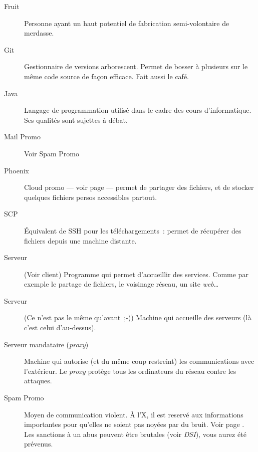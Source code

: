 \begin{description}
  \item[Fruit] Personne ayant un haut potentiel de fabrication semi-volontaire de merdasse.%

  \item[Git] Gestionnaire de versions arborescent. Permet de bosser à plusieurs sur le même code source de façon efficace. Fait aussi le café.



   \item[Java] Langage de programmation utilisé dans le cadre des cours d'informatique. Ses qualités sont sujettes à débat.

   \item[Mail Promo] Voir Spam Promo

  \item[Phoenix] Cloud promo — voir page \pageref{phoenix} — permet de partager des fichiers, et de stocker quelques fichiers persos accessibles partout.

  \item[SCP] Équivalent de SSH pour les téléchargements~: permet de récupérer des fichiers depuis une machine distante.

  \item[Serveur] (Voir client) Programme qui permet d'accueillir des services. Comme par exemple le partage de fichiers, le voisinage réseau, un site \emph{web}\ldots\

  \item[Serveur] (Ce n'est pas le même qu'avant~;-)) Machine qui accueille des serveurs (là c'est celui d'au-dessus).

  \item[Serveur mandataire (\emph{proxy})] Machine qui autorise
(et du même coup restreint) les communications avec l'extérieur. Le \emph{proxy} protège tous les ordinateurs du réseau contre les attaques.

  \item[Spam Promo] Moyen de communication violent. À l'X, il est reservé aux informations importantes pour qu'elles ne soient pas noyées par du bruit. Voir page \pageref{mails}. Les sanctions à un abus peuvent être brutales (voir \emph{DSI}), vous aurez été prévenus.


\end{description}
